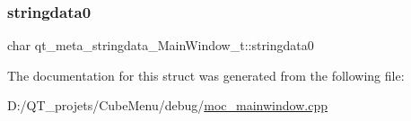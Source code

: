 \subsubsection{\texorpdfstring{stringdata0}{stringdata0}}
{\footnotesize\ttfamily char qt\+\_\+meta\+\_\+stringdata\+\_\+\+Main\+Window\+\_\+t\+::stringdata0}



The documentation for this struct was generated from the following file\+:\begin{DoxyCompactItemize}
\item 
D\+:/\+Q\+T\+\_\+projets/\+Cube\+Menu/debug/\hyperlink{debug_2moc__mainwindow_8cpp}{moc\+\_\+mainwindow.\+cpp}\end{DoxyCompactItemize}
